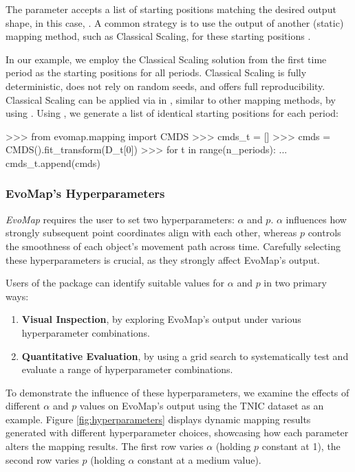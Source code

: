 \documentclass[article]{jss}
\begin{document}
The  parameter accepts a list of starting positions matching the desired output shape, in this case, 
. A common strategy is to use the output of another (static) mapping method, such as Classical Scaling, for 
these starting positions \citep{DeLeeuw+Mair:2009}.

In our example, we employ the Classical Scaling solution from the first time period as the starting positions for all 
periods. Classical Scaling is fully deterministic, does not rely on random seeds, and offers full reproducibility. 
Classical Scaling can be applied via  in , similar to other 
mapping methods, by using . Using , we generate a list of identical starting positions 
for each period:

\begin{CodeChunk}
\begin{CodeInput}
>>> from evomap.mapping import CMDS
>>> cmds_t = []
>>> cmds = CMDS().fit_transform(D_t[0])
>>> for t in range(n_periods):
...     cmds_t.append(cmds)
\end{CodeInput}
\end{CodeChunk}

\subsubsection{EvoMap's Hyperparameters}

\emph{EvoMap} requires the user to set two hyperparameters: $\alpha$ and $p$. 
$\alpha$ influences how strongly subsequent point coordinates align with each other, 
whereas $p$ controls the smoothness of each object's movement path across time. Carefully selecting
these hyperparameters is crucial, as they strongly affect EvoMap's output. 

Users of the  package can identify suitable values for $\alpha$ and $p$ in two primary ways: 

\begin{enumerate}
  \item \textbf{Visual Inspection}, by exploring EvoMap's output under various hyperparameter combinations. 
  \item \textbf{Quantitative Evaluation}, by using a grid search to systematically test and evaluate a range of %
  hyperparameter combinations.
\end{enumerate}

To demonstrate the influence of these hyperparameters, we examine the effects of different $\alpha$ and $p$ 
values on EvoMap's output using the TNIC dataset as an example. Figure \ref{fig:hyperparameters} displays 
dynamic mapping results generated with different hyperparameter choices, showcasing how each parameter alters the mapping 
results. The first row varies $\alpha$ (holding $p$ constant at 1), the second row varies $p$ (holding $\alpha$ constant
at a medium value).
\end{document}
